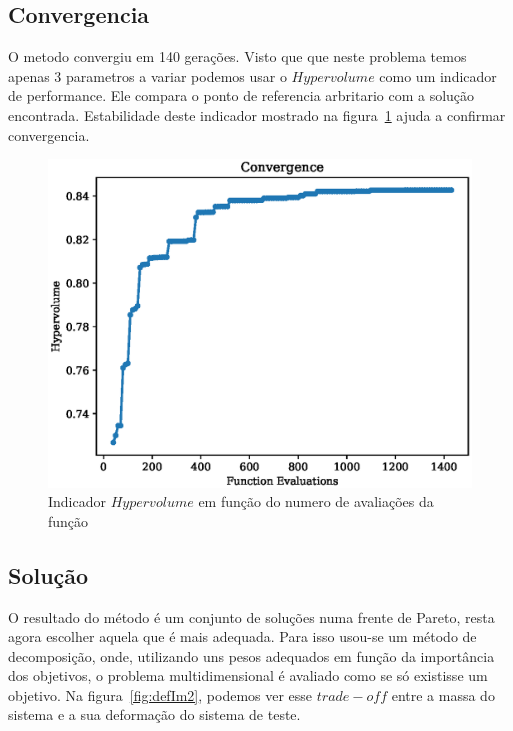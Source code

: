 \documentclass[a4paper,12pt]{article}
\begin{document}
\subsection{Convergencia}

O metodo convergiu em 140 gerações. Visto que que neste problema temos apenas 3 parametros a variar podemos usar o $Hypervolume$ como um indicador de performance. Ele compara o ponto de referencia arbritario com a solução encontrada. Estabilidade deste indicador mostrado na figura~\ref{fig:hyper} ajuda a confirmar convergencia.


\begin{figure}[h]
\begin{center}
\includegraphics[scale=0.7]{convergence.eps}
\end{center}
\caption{Indicador $Hypervolume$ em função do numero de avaliações da função}
\label{fig:hyper}
\end{figure}

\subsection{Solução}

O resultado do método é um conjunto de soluções numa frente de Pareto, resta agora escolher aquela que é mais adequada. Para isso usou-se um método de decomposição, onde, utilizando uns pesos adequados em função da importância dos objetivos, o problema multidimensional é avaliado como se só existisse um objetivo. Na figura~\ref{fig:defIm2}, podemos ver esse $trade-off$ entre a massa do sistema e a sua deformação do sistema de teste.
\end{document}
